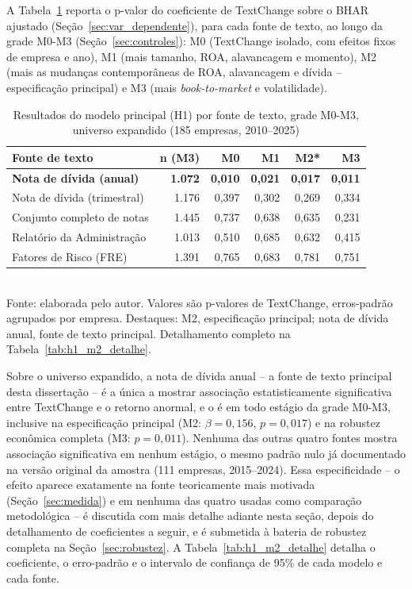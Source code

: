 \documentclass[a4paper,12pt]{report}
\begin{document}
A Tabela~\ref{tab:h1} reporta o p-valor do coeficiente de TextChange sobre o BHAR ajustado (Seção~\ref{sec:var_dependente}), para cada fonte de texto, ao longo da grade M0-M3 (Seção~\ref{sec:controles}): M0 (TextChange isolado, com efeitos fixos de empresa e ano), M1 (mais tamanho, ROA, alavancagem e momento), M2 (mais as mudanças contemporâneas de ROA, alavancagem e dívida -- especificação principal) e M3 (mais \textit{book-to-market} e volatilidade).

\begin{table}[htbp]
    \centering
    \caption{Resultados do modelo principal (H1) por fonte de texto, grade M0-M3, universo expandido (185 empresas, 2010--2025)}
    \label{tab:h1}
    \small
    \begin{tabular}{@{}lrrrrr@{}}
        \toprule
        \textbf{Fonte de texto} & \textbf{n (M3)} & \textbf{M0} & \textbf{M1} & \cellcolor{m2principal}\textbf{M2*} & \textbf{M3} \\
        \midrule
        \rowcolor{fontechave}
        \textbf{Nota de dívida (anual)}       & \textbf{1.072} & \textbf{0,010} & \textbf{0,021} & \cellcolor{m2intersecao}\textbf{0,017} & \textbf{0,011} \\
        Nota de dívida (trimestral)  & 1.176 & 0,397 & 0,302 & \cellcolor{m2principal}0,269 & 0,334 \\
        Conjunto completo de notas   & 1.445 & 0,737 & 0,638 & \cellcolor{m2principal}0,635 & 0,231 \\
        Relatório da Administração   & 1.013 & 0,510 & 0,685 & \cellcolor{m2principal}0,632 & 0,415 \\
        Fatores de Risco (FRE)       & 1.391 & 0,765 & 0,683 & \cellcolor{m2principal}0,781 & 0,751 \\
        \bottomrule
    \end{tabular}
    \\[0.3cm]
    {\footnotesize Fonte: elaborada pelo autor. Valores são p-valores de TextChange, erros-padrão agrupados por empresa. Destaques: M2, especificação principal; nota de dívida anual, fonte de texto principal. Detalhamento completo na Tabela~\ref{tab:h1_m2_detalhe}.}
\end{table}

Sobre o universo expandido, a nota de dívida anual -- a fonte de texto principal desta dissertação -- é a única a mostrar associação estatisticamente significativa entre TextChange e o retorno anormal, e o é em todo estágio da grade M0-M3, inclusive na especificação principal (M2: $\beta=0{,}156$, $p=0{,}017$) e na robustez econômica completa (M3: $p=0{,}011$). Nenhuma das outras quatro fontes mostra associação significativa em nenhum estágio, o mesmo padrão nulo já documentado na versão original da amostra (111 empresas, 2015--2024). Essa especificidade -- o efeito aparece exatamente na fonte teoricamente mais motivada (Seção~\ref{sec:medida}) e em nenhuma das quatro usadas como comparação metodológica -- é discutida com mais detalhe adiante nesta seção, depois do detalhamento de coeficientes a seguir, e é submetida à bateria de robustez completa na Seção~\ref{sec:robustez}. A Tabela~\ref{tab:h1_m2_detalhe} detalha o coeficiente, o erro-padrão e o intervalo de confiança de 95\% de cada modelo e cada fonte.
\end{document}
